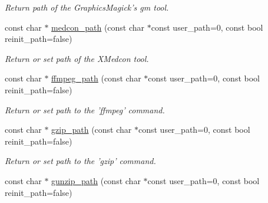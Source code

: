 \begin{DoxyCompactItemize}
\begin{DoxyCompactList}\small\item\em Return path of the GraphicsMagick's {\ttfamily gm} tool. \item\end{DoxyCompactList}\item 
\hypertarget{namespacecimg__library_1_1cimg_aaedba1291890f50edb5be58ef662e516}{
const char $\ast$ \hyperlink{namespacecimg__library_1_1cimg_aaedba1291890f50edb5be58ef662e516}{medcon\_\-path} (const char $\ast$const user\_\-path=0, const bool reinit\_\-path=false)}
\label{namespacecimg__library_1_1cimg_aaedba1291890f50edb5be58ef662e516}

\begin{DoxyCompactList}\small\item\em Return or set path of the {\ttfamily XMedcon} tool. \item\end{DoxyCompactList}\item 
\hypertarget{namespacecimg__library_1_1cimg_abf1666b982cb372129f2ae2fdc748ef2}{
const char $\ast$ \hyperlink{namespacecimg__library_1_1cimg_abf1666b982cb372129f2ae2fdc748ef2}{ffmpeg\_\-path} (const char $\ast$const user\_\-path=0, const bool reinit\_\-path=false)}
\label{namespacecimg__library_1_1cimg_abf1666b982cb372129f2ae2fdc748ef2}

\begin{DoxyCompactList}\small\item\em Return or set path to the 'ffmpeg' command. \item\end{DoxyCompactList}\item 
\hypertarget{namespacecimg__library_1_1cimg_a75f3391e7a393c1c1fe43537004537e2}{
const char $\ast$ \hyperlink{namespacecimg__library_1_1cimg_a75f3391e7a393c1c1fe43537004537e2}{gzip\_\-path} (const char $\ast$const user\_\-path=0, const bool reinit\_\-path=false)}
\label{namespacecimg__library_1_1cimg_a75f3391e7a393c1c1fe43537004537e2}

\begin{DoxyCompactList}\small\item\em Return or set path to the 'gzip' command. \item\end{DoxyCompactList}\item 
\hypertarget{namespacecimg__library_1_1cimg_a08f71c29acfe85d5b8718900e995b779}{
const char $\ast$ \hyperlink{namespacecimg__library_1_1cimg_a08f71c29acfe85d5b8718900e995b779}{gunzip\_\-path} (const char $\ast$const user\_\-path=0, const bool reinit\_\-path=false)}
\label{namespacecimg__library_1_1cimg_a08f71c29acfe85d5b8718900e995b779}


\end{DoxyCompactItemize}

